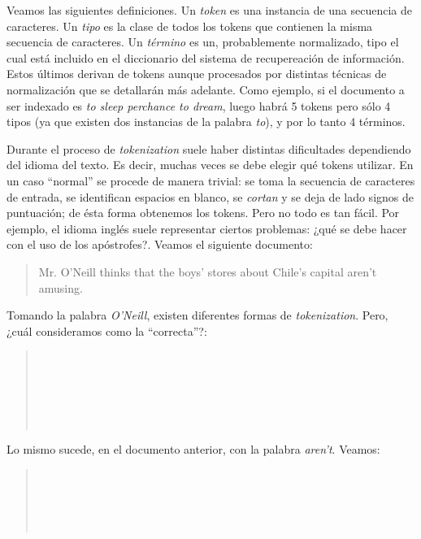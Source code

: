 		Veamos las siguientes definiciones. Un \textit{token} es una instancia de una secuencia de caracteres. Un \textit{tipo} es la clase de todos los tokens que contienen la misma secuencia de caracteres. Un \textit{término} es un, probablemente normalizado, tipo el cual está incluido en el diccionario del sistema de recupereación de información. Estos últimos derivan de tokens aunque procesados por distintas técnicas de normalización que se detallarán más adelante. Como ejemplo, si el documento a ser indexado es \textit{to sleep perchance to dream}, luego habrá 5 tokens pero sólo 4 tipos (ya que existen dos instancias de la palabra \textit{to}), y por lo tanto 4 términos.
		
		Durante el proceso de \textit{tokenization} suele haber distintas dificultades dependiendo del idioma del texto. Es decir, muchas veces se debe elegir qué tokens utilizar. En un caso \enquote{normal} se procede de manera trivial: se toma la secuencia de caracteres de entrada, se identifican espacios en blanco, se \textit{cortan} y se deja de lado signos de puntuación; de ésta forma obtenemos los tokens. Pero no todo es tan fácil. Por ejemplo, el idioma inglés suele representar ciertos problemas: ¿qué se debe hacer con el uso de los apóstrofes?. Veamos el siguiente documento:
		\begin{quote}
			Mr. O'Neill thinks that the boys' stores about Chile's capital aren't amusing.
		\end{quote}
		
		Tomando la palabra \textit{O'Neill}, existen diferentes formas de \textit{tokenization}. Pero, ¿cuál consideramos como la \enquote{correcta}?:
		\begin{quote}
			\begin{ttfamily}
				 \\
				 \\
				 \\
				  \\
				  \\
			\end{ttfamily}
		\end{quote}
		
		Lo mismo sucede, en el documento anterior, con la palabra \textit{aren't}. Veamos:
		\begin{quote}
			\begin{ttfamily}
				\fbox{aren't} \\
				\fbox{arent} \\
				 \fbox{n't} \\
				 \fbox{t} \\
			\end{ttfamily}
		\end{quote}
		
